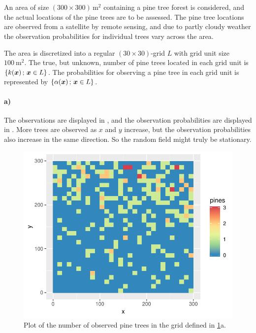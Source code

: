 \section{}
\label{sec:problem2}

An area of size $(300 \times 300) \, \si{\meter^2}$ containing a pine tree forest is considered, and the actual locations of the pine trees are to be assessed. The pine tree locations are observed from a satellite by remote sensing, and due to partly cloudy weather the observation probabilities for individual trees vary across the area.

The area is discretized into a regular $(30 \times 30)$-grid $L$ with grid unit size $\SI{100}{\meter^2}$. The true, but unknown, number of pine trees located in each grid unit is \newline $\{k(\bm{x}) \,;\, \bm{x} \in L\}$. The probabilities for observing a pine tree in each grid unit is represented by $\{\alpha(\bm{x}) \,;\, \bm{x} \in L\}$. 

\paragraph{a)}
The observations are displayed in , and the observation probabilities are displayed in . More trees are observed as $x$ and $y$ increase, but the observation probabilities also increase in the same direction. So the random field might truly be stationary.

\begin{figure}
    \centering
    \includegraphics{figures/p2_pines.pdf}
    \caption{Plot of the number of observed pine trees in the grid defined in \ref{sec:problem2}a.}
    \label{fig:p2_pines}
\end{figure}

